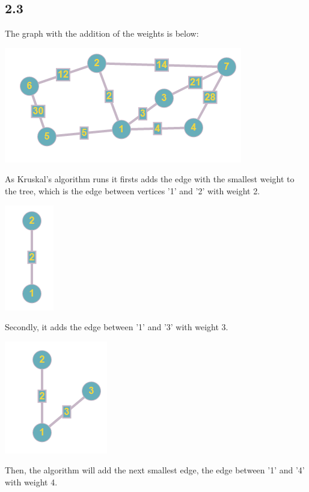\documentclass{article}
\begin{document}
\subsection*{2.3}
The graph with the addition of the weights is below:
\newline
\begin{center}
\includegraphics{b23W}
\end{center}
As Kruskal's algorithm runs it firsts adds the edge with the smallest weight to the tree, which is the edge between vertices '1' and '2' with weight 2. 
\newline
\begin{center}
\includegraphics{b231}
\end{center}
Secondly, it adds the edge between '1' and '3' with weight 3.
\newline
\begin{center}
\includegraphics{b232}
\end{center}
Then, the algorithm will add the next smallest edge, the edge between '1' and '4' with weight 4.
\newline
\end{document}
